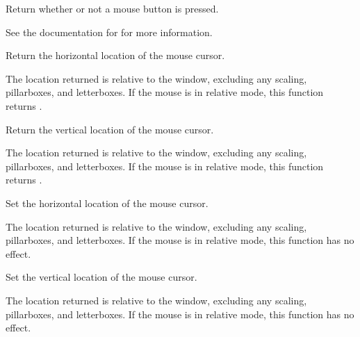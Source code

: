\documentclass[letterpaper,10pt,english]{sphinxmanual}
\begin{document}
\begin{fulllineitems}
\label{mouse:sge.mouse.get_pressed}
Return whether or not a mouse button is pressed.

See the documentation for {\hyperref[input:sge.input.MouseButtonPress]{\emph{}}} for
more information.

\end{fulllineitems}


\begin{fulllineitems}
\label{mouse:sge.mouse.get_x}
Return the horizontal location of the mouse cursor.

The location returned is relative to the window, excluding any
scaling, pillarboxes, and letterboxes.  If the mouse is in
relative mode, this function returns .

\end{fulllineitems}


\begin{fulllineitems}
\label{mouse:sge.mouse.get_y}
Return the vertical location of the mouse cursor.

The location returned is relative to the window, excluding any
scaling, pillarboxes, and letterboxes.  If the mouse is in
relative mode, this function returns .

\end{fulllineitems}


\begin{fulllineitems}
\label{mouse:sge.mouse.set_x}
Set the horizontal location of the mouse cursor.

The location returned is relative to the window, excluding any
scaling, pillarboxes, and letterboxes.  If the mouse is in
relative mode, this function has no effect.

\end{fulllineitems}


\begin{fulllineitems}
\label{mouse:sge.mouse.set_y}
Set the vertical location of the mouse cursor.

The location returned is relative to the window, excluding any
scaling, pillarboxes, and letterboxes.  If the mouse is in
relative mode, this function has no effect.

\end{fulllineitems}
\end{document}
